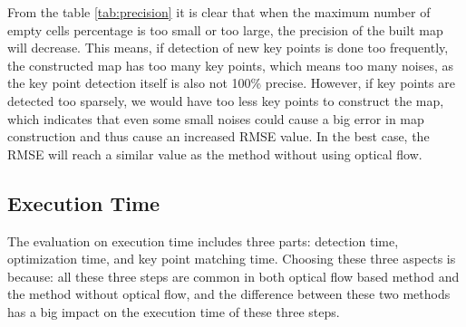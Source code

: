 \documentclass[11pt]{easychair}
\begin{document}
From the table \ref{tab:precision} it is clear that when the maximum number of empty cells percentage is too small or too large, the precision of the built map will decrease. This means, if detection of new key points is done too frequently, the constructed map has too many key points, which means too many noises, as the key point detection itself is also not 100\% precise. However, if key points are detected too sparsely, we would have too less key points to construct the map, which indicates that even some small noises could cause a big error in map construction and thus cause an increased RMSE value. In the best case, the RMSE will reach a similar value as the method without using optical flow. %

	
	


\subsection{Execution Time}
The evaluation on execution time includes three parts: detection time, optimization time, and key point matching time. Choosing these three aspects is because: all these three steps are common in both optical flow based method and the method without optical flow, and the difference between these two methods has a big impact on the execution time of these three steps.

\end{document}
